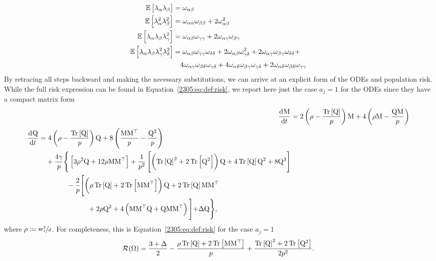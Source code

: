 \begin{align*}
  \mathbb{E}\left[\lambda_\alpha \lambda_\beta\right] &= \omega_{\alpha\beta}\\
  \mathbb{E}\left[\lambda_\alpha^2 \lambda_\beta^2\right] 
  &= \omega_{\alpha\alpha}  \omega_{\beta\beta} + 2 \omega_{\alpha\beta}^2 \\
  \mathbb{E}\left[\lambda_\alpha \lambda_\beta \lambda_\gamma^2\right]
  &= \omega_{\alpha\beta}\omega_{\gamma\gamma} + 2 \omega_{\alpha\gamma}\omega_{\beta\gamma}\\
  \mathbb{E}\left[\lambda_\alpha \lambda_\beta \lambda_\gamma^2 \lambda_\delta^2\right]
  &= \omega_{\alpha\beta}\omega_{\gamma\gamma}\omega_{\delta\delta} + 2\omega_{\alpha\beta}\omega_{\gamma\delta}^2 + 2\omega_{\alpha\gamma}\omega_{\beta\gamma}\omega_{\delta\delta} +\\
  &\quad4\omega_{\alpha\gamma}\omega_{\beta\delta}\omega_{\gamma\delta}+4\omega_{\alpha\delta}\omega_{\beta\gamma}\omega_{\gamma\delta} + 2\omega_{\alpha\delta}\omega_{\beta\delta}\omega_{\gamma\gamma}
\end{align*}
By retracing all steps backward and making the necessary substitutions,
we can arrive at an explicit form of the ODEs and population risk. 
While the full risk expression can be found in Equation~\eqref{2305:eq:def:risk}, we report here just the case \(a_j=1\) for the ODEs since they have a compact matrix form
\begin{subequations}\label{2305:eq:full_squared_ode}\begin{align}
    \label{2305:eq:quadraticODE_M}
    \dod{\M}{t} &=
        2\left(\rho - \frac{\Tr{\Q}}p\right)\M +
        4\left(\rho\M - \frac{\Q\M}{p}\right) \\
    \label{2305:eq:quadraticODE_Q}
    \begin{split}
        \dod{\Q}{t} &= 
            4\left(\rho - \frac{\Tr{\Q}}p\right)\Q +
            8\left(\frac{\M\M^\top}{p} - \frac{\Q^2}{p}\right) \\
        &\quad+\frac{4 \gamma}{p} \Biggr\{
            \left[3\rho^2\Q + 12\rho\M\M^\top\right] +\frac1{p^2}\left[\left(\Tr{\Q}^2+2\Tr{\Q^2}\right)\Q +
                            4\Tr{\Q}\Q^2 + 8\Q^3
                        \right]\\
            &\qquad\quad\quad
            -\frac2{p}\Biggl[\left(\rho\Tr{\Q}+2\Tr{\M\M^\top}\right)\Q +
                            2\Tr{\Q}\M\M^\top\\
                            &\qquad\qquad\qquad\quad+ 2\rho\Q^2+ 
                            4\left(\M\M^\top\Q + \Q\M\M^\top\right)
                        \Biggl] + \Delta \Q\Biggr\},
    \end{split}
\end{align}\end{subequations}
where \(\rho \coloneqq \sfrac{{\boldsymbol{w}}_\star^2}{d}\). 
For completeness, this is Equation~\eqref{2305:eq:def:risk} for the case \(a_j=1\)
\begin{equation} \label{2305:eq:risk_square}\begin{split}
  \mathcal{R}(\Omega)
       =  \frac{3+\Delta}{2}
           - \frac{\rho\Tr{\Q}+2\Tr{\M\M^\top}}{p}
           + \frac{\Tr{\Q}^2+2\Tr{\Q^2}}{2p^2}.
\end{split}\end{equation}
